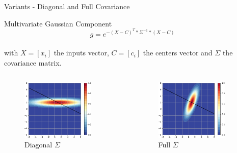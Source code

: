 \documentclass{beamer}
\begin{document}
\begin{frame}{Variants - Diagonal and Full Covariance}
    \begin{block}{Multivariate Gaussian Component}
    $$ g = e^{-(X-C)^T * \Sigma^{-1} * (X-C)}$$ \\
    with $X=[x_i]$ the inputs vector, $C=[c_i]$ the centers vector and $\Sigma$ the covariance matrix.
    \end{block}
    
    \begin{columns}
    \begin{column}{.5\textwidth}
    \begin{figure}
        \centering
        \includegraphics[width=0.81\textwidth]{images/Variants-Diag-Full-Cov/diag_g_activity_cropped.png}
        \caption*{Diagonal $\Sigma$}
    \end{figure}
    \end{column}
     \begin{column}{.5\textwidth}
    \begin{figure}
        \centering
        \includegraphics[width=0.81\textwidth]{images/Variants-Diag-Full-Cov/full_g_activity_cropped.png}
        \caption*{Full $\Sigma$}
    \end{figure}
    \end{column}
    \end{columns}
    
\end{frame}
\end{document}

